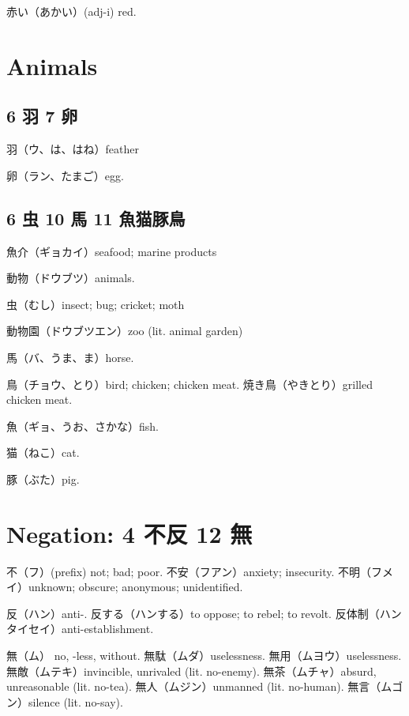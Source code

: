 赤い（あかい）(adj-i) red.

\section{Animals}

\subsection{6 羽 7 卵}

羽（ウ、は、はね）feather

卵（ラン、たまご）egg.

\subsection{6 虫 10 馬 11 魚猫豚鳥}

魚介（ギョカイ）seafood; marine products

動物（ドウブツ）animals.

虫（むし）insect; bug; cricket; moth

動物園（ドウブツエン）zoo (lit. animal garden)

馬（バ、うま、ま）horse.

鳥（チョウ、とり）bird; chicken; chicken meat.
焼き鳥（やきとり）grilled chicken meat.

魚（ギョ、うお、さかな）fish.

猫（ねこ）cat.

豚（ぶた）pig.

\section{Negation: 4 不反 12 無}

不（フ）(prefix) not; bad; poor.
不安（フアン）anxiety; insecurity.
不明（フメイ）unknown; obscure; anonymous; unidentified.

反（ハン）anti-.
反する（ハンする）to oppose; to rebel; to revolt.
反体制（ハンタイセイ）anti-establishment.

無（ム） no, -less, without.
無駄（ムダ）uselessness.
無用（ムヨウ）uselessness.
無敵（ムテキ）invincible, unrivaled (lit. no-enemy).
無茶（ムチャ）absurd, unreasonable (lit. no-tea).
無人（ムジン）unmanned (lit. no-human).
無言（ムゴン）silence (lit. no-say).
